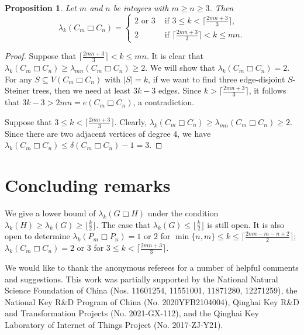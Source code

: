 \documentclass[final]{dmtcs-episciences}
\newtheorem{proposition}{Proposition}[section]
\begin{document}
\begin{proposition}
Let $m$ and $n$ be integers with $m\geq n\geq 3$. Then
\[
\lambda_k(C_m\Box C_n)= \begin{cases}
2\text{ or }3 & \text{ if $3\leq k<\lceil \frac{2mn+3}{3}\rceil$,}\\
2 & \text{ if $\lceil \frac{2mn+3}{3}\rceil <k\leq mn$.}
\end{cases}
\]
\end{proposition}
\begin{proof}
Suppose that $\lceil \frac{2mn+3}{3}\rceil <k\leq mn$. It is clear
that $\lambda_k(C_m\Box C_n)\geq \lambda_{mn}(C_m\Box C_n)\geq 2$.
We will show that $\lambda_k(C_m\Box C_n)=2$. For any $S\subseteq
V(C_m\Box C_n)$ with $|S|=k$, if we want to find three edge-disjoint
$S$-Steiner trees, then we need at least $3k-3$ edges. Since
$k>\lceil \frac{2mn+3}{3}\rceil$, it follows that
$3k-3>2mn=e(C_m\Box C_n)$, a contradiction.

Suppose that $3\leq k<\lceil \frac{2mn+3}{3}\rceil$. Clearly,
$\lambda_k(C_m\Box C_n)\geq \lambda_{mn}(C_m\Box C_n)\geq 2$. Since
there are two adjacent vertices of degree $4$, we have
$\lambda_k(C_m\Box C_n)\leq \delta(C_m\Box C_n)-1=3$.
\end{proof}

\section{Concluding remarks}

We give a lower bound of $\lambda_k(G\Box H)$ under the condition
$\lambda_k(H)\geq \lambda_k(G)\geq \lfloor \frac{k}{2}\rfloor$. The
case that $\lambda_k(G)\leq \lfloor \frac{k}{2}\rfloor$ is still
open. It is also open to determine $\lambda_k(P_m\Box P_n)=1$ or $2$
for $\min\{n,m\}\leq k\leq \lceil \frac{2mn-m-n+2}{2}\rceil$;
$\lambda_k(C_m\Box C_n)=2$ or $3$ for $3\leq k<\lceil
\frac{2mn+3}{3}\rceil$.

\acknowledgments

We would like to thank the anonymous referees for a number of
helpful comments and suggestions. This work was partially supported
by the National Natural Science Foundation of China (Nos. 11601254,
11551001, 11871280, 12271259), the National Key R\&D Program of
China (No. 2020YFB2104004), Qinghai Key R\&D and Transformation
Projects (No. 2021-GX-112), and the Qinghai Key Laboratory of
Internet of Things Project (No. 2017-ZJ-Y21).
\end{document}
